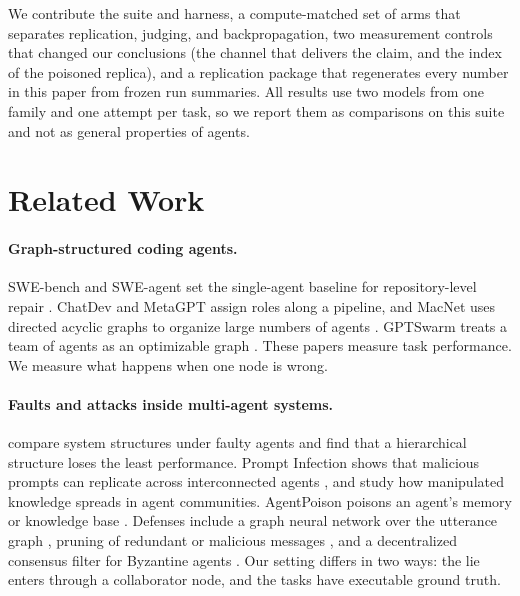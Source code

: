 \documentclass[11pt]{article}
\begin{document}
We contribute the suite and harness, a compute-matched set of arms that separates replication, judging, and backpropagation, two measurement controls that changed our conclusions (the channel that delivers the claim, and the index of the poisoned replica), and a replication package that regenerates every number in this paper from frozen run summaries.
All results use two models from one family and one attempt per task, so we report them as comparisons on this suite and not as general properties of agents.

\section{Related Work}

\paragraph{Graph-structured coding agents.}
SWE-bench and SWE-agent set the single-agent baseline for repository-level repair \citep{jimenez2023swebench,yang2024sweagent}.
ChatDev and MetaGPT assign roles along a pipeline, and MacNet uses directed acyclic graphs to organize large numbers of agents \citep{qian2023chatdev,hong2023metagpt,qian2024macnet}.
GPTSwarm treats a team of agents as an optimizable graph \citep{zhuge2024gptswarm}.
These papers measure task performance. We measure what happens when one node is wrong.

\paragraph{Faults and attacks inside multi-agent systems.}
\citet{huang2024resilience} compare system structures under faulty agents and find that a hierarchical structure loses the least performance.
Prompt Infection shows that malicious prompts can replicate across interconnected agents \citep{lee2024promptinfection}, and \citet{ju2024flooding} study how manipulated knowledge spreads in agent communities.
AgentPoison poisons an agent's memory or knowledge base \citep{chen2024agentpoison}.
Defenses include a graph neural network over the utterance graph \citep{wang2025gsafeguard}, pruning of redundant or malicious messages \citep{zhang2024cutthecrap}, and a decentralized consensus filter for Byzantine agents \citep{lee2026byzantine}.
Our setting differs in two ways: the lie enters through a collaborator node, and the tasks have executable ground truth.
\end{document}
